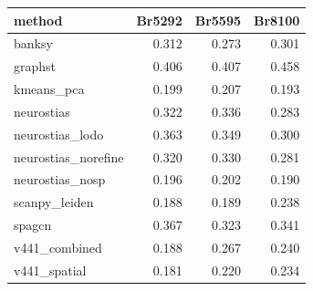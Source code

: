 \begin{tabular}{lrrr}
\toprule
method & Br5292 & Br5595 & Br8100 \\
\midrule
banksy & 0.312 & 0.273 & 0.301 \\
graphst & 0.406 & 0.407 & 0.458 \\
kmeans_pca & 0.199 & 0.207 & 0.193 \\
neurostias & 0.322 & 0.336 & 0.283 \\
neurostias_lodo & 0.363 & 0.349 & 0.300 \\
neurostias_norefine & 0.320 & 0.330 & 0.281 \\
neurostias_nosp & 0.196 & 0.202 & 0.190 \\
scanpy_leiden & 0.188 & 0.189 & 0.238 \\
spagcn & 0.367 & 0.323 & 0.341 \\
v441_combined & 0.188 & 0.267 & 0.240 \\
v441_spatial & 0.181 & 0.220 & 0.234 \\
\bottomrule
\end{tabular}
